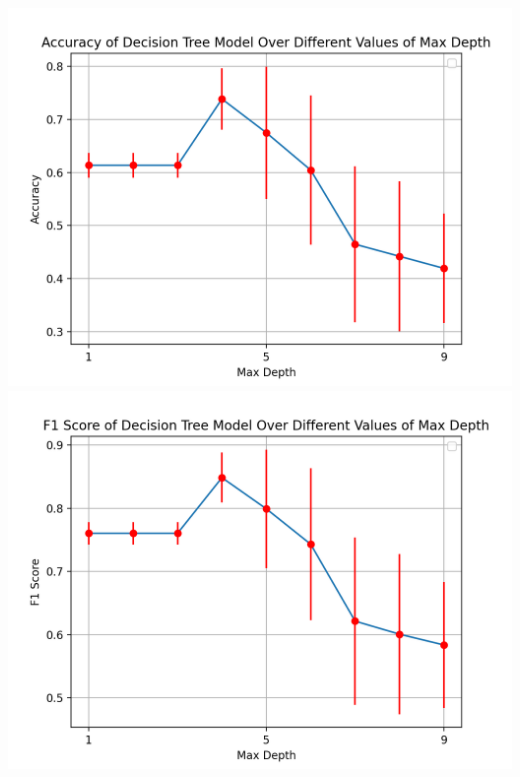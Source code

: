 \documentclass{article}
\begin{document}
\begin{minipage}{0.49\textwidth}
    \centering 

    \includegraphics*[width=\textwidth]{./src/figures/Accuracy Titanic.png}
    \includegraphics*[width=\textwidth]{./src/figures/F-Score Titanic.png}

\end{minipage}
\end{document}
